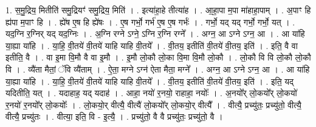 \documentclass[17pt]{extarticle}
\begin{document}
1. स॒मु॒द्रिय॒ मितीति॑ समु॒द्रियꣳ॑ समु॒द्रिय॒ मिति॑ । . इत्या॑हा॒हे तीत्या॑ह । . आ॒हा॒पा म॒पा मा॑हाहा॒पाम् । . अ॒पाꣳ हि ह्य॑पा म॒पाꣳ हि । . ह्ये॑ष ए॒ष हि ह्ये॑षः । . ए॒ष गर्भो॒ गर्भ॑ ए॒ष ए॒ष गर्भः॑ । . गर्भो॒ यद् यद् गर्भो॒ गर्भो॒ यत् । . यद॒ग्नि र॒ग्निर् यद् यद॒ग्निः । . अ॒ग्नि रग्ने ऽग्ने॒ ऽग्नि र॒ग्नि रग्ने᳚ । . अग्न॒ आ ऽग्ने ऽग्न॒ आ । . आ या॑हि या॒ह्या या॑हि । . या॒हि॒ वी॒तये॑ वी॒तये॑ याहि याहि वी॒तये᳚ । . वी॒तय॒ इतीति॑ वी॒तये॑ वी॒तय॒ इति॑ । . इति॒ वै वा इतीति॒ वै । . वा इ॒मा वि॒मौ वै वा इ॒मौ । . इ॒मौ लो॒कौ लो॒का वि॒मा वि॒मौ लो॒कौ । . लो॒कौ वि वि लो॒कौ लो॒कौ वि । . व्यै॑ता मैतां॒ ॅवि व्यै॑ताम् । . ऐ॒ता॒ मग्ने ऽग्न॑ ऐता मैता॒ मग्ने᳚ । . अग्न॒ आ ऽग्ने ऽग्न॒ आ । . आ या॑हि या॒ह्या या॑हि । . या॒हि॒ वी॒तये॑ वी॒तये॑ याहि याहि वी॒तये᳚ । . वी॒तय॒ इतीति॑ वी॒तये॑ वी॒तय॒ इति॑ । . इति॒ यद् यदितीति॒ यत् । . यदाहाह॒ यद् यदाह॑ । . आहा॒ नयो॑ र॒नयो॒ राहाहा॒ नयोः᳚ । . अ॒नयो᳚र् लो॒कयो᳚र् लो॒कयो॑ र॒नयो॑ र॒नयो᳚र् लो॒कयोः᳚ । . लो॒कयो॒र् वीत्यै॒ वीत्यै॑ लो॒कयो᳚र् लो॒कयो॒र् वीत्यै᳚ । . वीत्यै॒ प्रच्यु॑तः॒ प्रच्यु॑तो॒ वीत्यै॒ वीत्यै॒ प्रच्यु॑तः । . वीत्या॒ इति॒ वि - इ॒त्यै॒ । . प्रच्यु॑तो॒ वै वै प्रच्यु॑तः॒ प्रच्यु॑तो॒ वै । \newline
\end{document}
